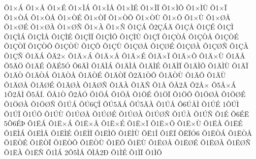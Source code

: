 {^^d51^^d7^^c1
^^d51^^d7^^c5
^^d51^^d7^^c9
^^d51^^d7^^cc^^c1
^^d51^^d7^^cc^^c5
^^d51^^d7^^cc^^c9
^^d51^^d7^^cc^^cf
^^d51^^d7^^cc^^d5
^^d51^^d7^^cc^^d9
^^d51^^d7^^cf
^^d51^^d7^^d2^^c1
^^d51^^d7^^d2^^c5
^^d51^^d7^^d2^^c9
^^d51^^d7^^d2^^cf
^^d51^^d7^^d2^^d5
^^d51^^d7^^d2^^d9
^^d51^^d7^^d5
^^d51^^d7^^d9
^^d51^^d7^^d8^^c5
^^d51^^d7^^d8^^c9
^^d51^^d7^^d8^^c0
^^d51^^d7^^d8^^d1
^^d51^^d7^^c0
^^d51^^d7^^d1
^^d51^^c7^^c1
^^d52^^c7^^c1^^c4
^^d51^^c7^^c5
^^d51^^c7^^c9
^^d51^^c7^^cc
^^d51^^c7^^cc^^c1
^^d51^^c7^^cc^^c5
^^d51^^c7^^cc^^c9
^^d51^^c7^^cc^^cf
^^d51^^c7^^cc^^d5
^^d51^^c7^^cc^^d9
^^d51^^c7^^cf
^^d51^^c7^^d2^^c1
^^d51^^c7^^d2^^c5
^^d51^^c7^^d2^^c9
^^d51^^c7^^d2^^cf
^^d51^^c7^^d2^^d5
^^d51^^c7^^d2^^d9
^^d51^^c7^^d5
^^d51^^c7^^d9
^^d51^^c7^^d8^^c5
^^d51^^c7^^d8^^c9
^^d51^^c7^^d8^^c0
^^d51^^c7^^d8^^d1
^^d51^^c7^^c0
^^d51^^c7^^d1
^^d51^^c4^^c1
^^d5^^c42^^d7
^^d51^^c4^^d7^^c1
^^d51^^c4^^d7^^c5
^^d51^^c4^^d7^^c9
^^d51^^c4^^d7^^cf
^^d51^^c4^^d7^^d5
^^d51^^c4^^d7^^d9
^^d51^^c4^^c5
^^d55^^c4^^d6
^^d51^^c4^^c9
^^d5^^c4^^c95^^d3
^^d56^^c4^^cc
^^d51^^c4^^cc^^c1
^^d51^^c4^^cc^^c5
^^d51^^c4^^cc^^c9
^^d51^^c4^^cc^^cf
^^d51^^c4^^cc^^d5
^^d51^^c4^^cc^^d9
^^d51^^c4^^cf
^^d51^^c4^^d2
^^d51^^c4^^d2^^c1
^^d51^^c4^^d2^^c5
^^d51^^c4^^d2^^c9
^^d51^^c4^^d2^^cf
^^d52^^c41^^d2^^d5
^^d51^^c4^^d2^^d9
^^d51^^c4^^d5
^^d51^^c4^^d9
^^d51^^c4^^d8^^c5
^^d51^^c4^^d8^^c9
^^d51^^c4^^d8^^c0
^^d51^^c4^^d8^^d1
^^d51^^c4^^c0
^^d51^^c4^^d1
^^d51^^c5
^^d5^^c52^^c2
^^d52^^c5^^d7
^^d55^^c5^^d7^^c1
1^^d52^^c5^^cc
^^d55^^c5^^cd.
^^d5^^c51^^d2
^^d52^^c5^^d3
^^d51^^d6^^c1
^^d51^^d6^^c5
^^d51^^d6^^c9
^^d51^^d6^^cf
^^d51^^d6^^d5
^^d51^^d6^^d8^^c5
^^d51^^d6^^d8^^c9
^^d51^^d6^^d8^^c0
^^d51^^d6^^d8^^d1
^^d51^^da^^c1
^^d5^^da6^^c7^^ce
^^d5^^da5^^c4^^c1
^^d5^^da5^^c4^^c0
^^d51^^da^^c5
^^d56^^da^^c5^^cc
^^d51^^da^^c9
1^^d5^^da^^cc
^^d51^^da^^cf
^^d51^^da^^d5
^^d51^^da^^d9
^^d51^^da^^d8^^c5
^^d51^^da^^d8^^c9
^^d51^^da^^d8^^c0
^^d51^^da^^d8^^d1
^^d51^^da^^c0
^^d51^^da^^d1
^^d51^^c9
^^d56^^c9^^cb
5^^d56^^c9^^de
^^d51^^cb^^c1
^^d51^^cb^^d7^^c1
^^d51^^cb^^d7^^c5
^^d51^^cb^^d7^^c9
^^d51^^cb^^d7^^cf
^^d51^^cb^^d7^^d5
^^d51^^cb^^d7^^d9
^^d51^^cb^^c5
^^d51^^cb^^c9
^^d51^^cb^^cc^^c1
^^d51^^cb^^cc^^c5
^^d51^^cb^^cc^^c9
^^d51^^cb^^cc^^cf
^^d51^^cb^^cc^^d5
^^d51^^cb^^cc^^d9
^^d5^^cb1^^ce
^^d51^^cb^^cf
^^d5^^cb^^cf^^d36
^^d51^^cb^^d2^^c1
^^d51^^cb^^d2^^c5
^^d51^^cb^^d2^^c9
^^d51^^cb^^d2^^cf
^^d51^^cb^^d2^^d5
^^d51^^cb^^d2^^d9
^^d51^^cb^^d5
^^d51^^cb^^d9
^^d51^^cb^^d8^^c5
^^d51^^cb^^d8^^c9
^^d51^^cb^^d8^^c0
^^d51^^cb^^d8^^d1
^^d51^^cb^^c0
^^d51^^cb^^d1
^^d51^^cc^^c1
2^^d55^^cc^^c5
^^d5^^cc^^c52^^d0
^^d51^^cc^^c9
^^d51^^cc^^cf
^^d51^^cc^^d5
}
